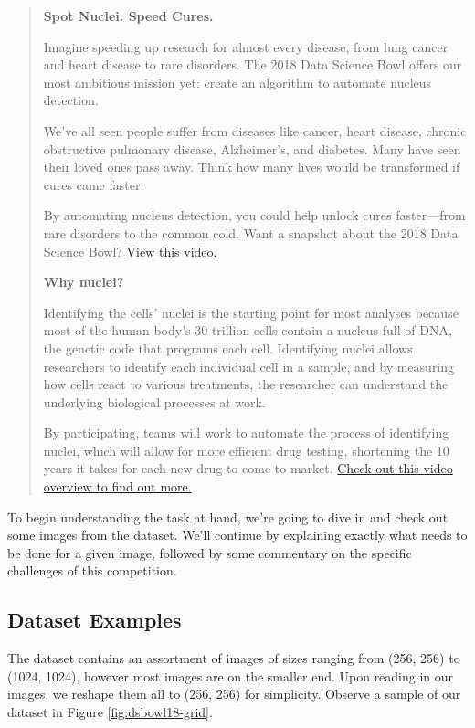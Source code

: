 \documentclass[paper=letter, fontsize=12pt]{article}
\numberwithin{equation}{section} %
\numberwithin{figure}{section} %
\numberwithin{table}{section} %
\begin{document}
\begin{quote}
    \textbf{\large Spot Nuclei. Speed Cures.}

    Imagine speeding up research for almost every disease, from lung cancer and
    heart disease to rare disorders. The 2018 Data Science Bowl offers our most
    ambitious mission yet: create an algorithm to automate nucleus detection.

    We’ve all seen people suffer from diseases like cancer, heart disease,
    chronic obstructive pulmonary disease, Alzheimer’s, and diabetes. Many have
    seen their loved ones pass away. Think how many lives would be transformed
    if cures came faster.

    By automating nucleus detection, you could help unlock cures faster—from
    rare disorders to the common cold. Want a snapshot about the 2018 Data
    Science Bowl? \href{https://www.youtube.com/watch?v=eHwkfhmJexs}{View this
    video.}

    \textbf{\large Why nuclei?}

    Identifying the cells’ nuclei is the starting point for most analyses
    because most of the human body’s 30 trillion cells contain a nucleus full
    of DNA, the genetic code that programs each cell. Identifying nuclei allows
    researchers to identify each individual cell in a sample, and by measuring
    how cells react to various treatments, the researcher can understand the
    underlying biological processes at work.

    By participating, teams will work to automate the process of identifying
    nuclei, which will allow for more efficient drug testing, shortening the 10
    years it takes for each new drug to come to market.
    \href{https://datasciencebowl.com/2018dsbtutorial/}{Check out this video
    overview to find out more.}
\end{quote}

To begin understanding the task at hand, we're going to dive in and check out 
some images from the dataset.  We'll continue by explaining exactly what needs
to be done for a given image, followed by some commentary on the specific 
challenges of this competition.

\subsection{Dataset Examples}

The dataset contains an assortment of images of sizes ranging from (256, 256)
to (1024, 1024), however most images are on the smaller end.  Upon reading in
our images, we reshape them all to (256, 256) for simplicity.  Observe a sample
of our dataset in Figure \ref{fig:dsbowl18-grid}.
\end{document}

